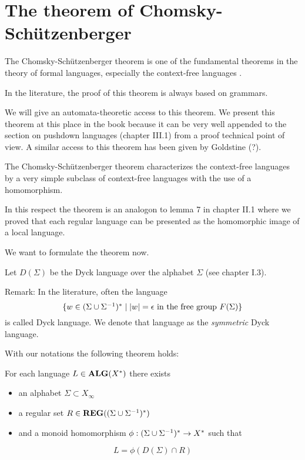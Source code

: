 \section{The theorem of Chomsky-Schützenberger}

The Chomsky-Schützenberger theorem is one of the fundamental theorems in the
theory of formal languages, especially the context-free languages \cite{ChSch}.

In the literature, the proof of this theorem is always based on grammars.

We will give an automata-theoretic access to this theorem. We present this
theorem at this place in the book because it can be very well appended to the
section on pushdown languages (chapter III.1) from a proof technical point of
view. A similar access to this theorem has been given by Goldstine
\cite{Goldstine77} (?).

The Chomsky-Schützenberger theorem characterizes the context-free languages
by a very simple subclass of context-free languages with the use of a
homomorphism.

In this respect the theorem is an analogon to lemma 7 in chapter II.1 where we
proved that each regular language can be presented as the homomorphic image of
a local language.

We want to formulate the theorem now.

Let $D(\Sigma)$ be the Dyck language over the alphabet $\Sigma$ (see chapter
I.3).

Remark: In the literature, often the language \[ \mbox{$\{w\in
(\Sigma \cup {\Sigma}^{-1})^* \mid |w|= \epsilon\text{ in the free group }F(\Sigma)\}$} \]
is called Dyck language. We denote that language as the {\em symmetric} Dyck
language.

With our notations the following theorem holds:
\begin{theorem} For each language $L\in \mbox{{\bf ALG}}(X^*)$
there exists
\begin{itemize}
  \item an alphabet $\Sigma \subset X_\infty$
  \item a regular set $R\in \mbox{{\bf REG}}((\Sigma \cup {\Sigma}^{-1})^*)$
  \item and a monoid homomorphism $\phi: (\Sigma \cup {\Sigma}^{-1})^* \to X^*$ such
  that
\end{itemize}
\[ L = \phi(D(\Sigma)\cap R) \]
\end{theorem}


